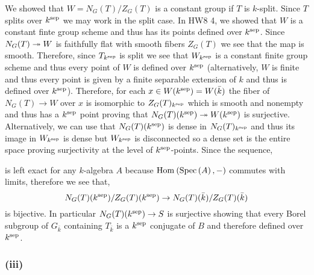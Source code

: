 \documentclass[12pt]{article}
\begin{document}
We showed that $W = N_G(T) / Z_G(T)$ is a constant group if $T$ is $k$-split. Since $T$ splits over $k^{\mathrm{sep}}$ we may work in the split case. In HW8 4, we showed that $W$ is a constant finte \etale group scheme and thus has its points defined over $k^{\mathrm{sep}}$. Since $N_G(T) \twoheadrightarrow W$ is faithfully flat with smooth fibers $Z_G(T)$ we see that the map is smooth. Therefore, since $T_{k^{\mathrm{sep}}}$ is split we see that $W_{k^{\mathrm{sep}}}$ is a constant finite \etale group scheme and thus every point of $W$ is defined over $k^{\mathrm{sep}}$ (alternatively, $W$ is finite \etale and thus every point is given by a finite separable extension of $k$ and thus is defined over $k^{\mathrm{sep}}$). Therefore, for each $x \in W(k^{\mathrm{sep}}) = W(\bar{k})$ the fiber of $N_G(T) \to W$ over $x$ is isomorphic to $Z_G(T)_{k^{\mathrm{sep}}}$ which is smooth and nonempty and thus has a $k^{\mathrm{sep}}$ point proving that $N_G(T)(k^{\mathrm{sep}}) \twoheadrightarrow W(k^{\mathrm{sep}})$ is surjective. Alternatively, we can use that $N_G(T)(k^{\mathrm{sep}})$ is dense in $N_G(T)_{k^{\mathrm{sep}}}$ and thus its image in $W_{k^{\mathrm{sep}}}$ is dense but $W_{k^{\mathrm{sep}}}$ is disconnected so a dense set is the entire space proving surjectivity at the level of $k^{\mathrm{sep}}$-points. Since the sequence,
\begin{center}
\end{center}
is left exact for any $k$-algebra $A$ because $\mathrm{Hom}_{} \left( \mathrm{Spec}\left( A \right), - \right)$ commutes with limits, therefore we see that,
\[ N_G(T)(k^{\mathrm{sep}})/Z_G(T)(k^{\mathrm{sep}}) \to N_G(T)(\bar{k}) / Z_G(T)(\bar{k}) \]
is bijective. In particular $N_G(T)(k^{\mathrm{sep}}) \to S$ is surjective showing that every Borel subgroup of $G_{\bar{k}}$ containing $T_{\bar{k}}$ is a $k^{\mathrm{sep}}$ conjugate of $B$ and therefore defined over $k^{\mathrm{sep}}$.

\subsubsection{(iii)}
\end{document}

